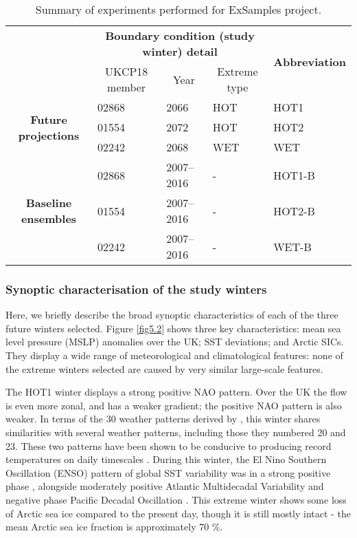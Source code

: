       \begin{table}[h]
        \centering
        \footnotesize
        \begin{tabular}{cllll}
          \toprule
          \multicolumn{1}{l}{\multirow{2}{*}{}}&\multicolumn{3}{c}{\textbf{Boundary condition (study winter) detail}}&\multicolumn{1}{c}{\multirow{2}{*}{\textbf{Abbreviation}}}\\\cmidrule(lr){2-4}
          \multicolumn{1}{l}{}&\multicolumn{1}{c}{UKCP18 member}&\multicolumn{1}{c}{Year}&\multicolumn{1}{c}{Extreme type}&\multicolumn{1}{c}{}\\\midrule
          \multirow{3}{*}{\textbf{Future projections}}&\multicolumn{1}{l}{02868}&\multicolumn{1}{l}{2066}&HOT&HOT1\\
          &\multicolumn{1}{l}{01554}&\multicolumn{1}{l}{2072}&HOT&HOT2\\
          &\multicolumn{1}{l}{02242}&\multicolumn{1}{l}{2068}&WET&WET\\\midrule
          \multirow{3}{*}{\textbf{Baseline ensembles}}&\multicolumn{1}{l}{02868}&\multicolumn{1}{l}{2007--2016}&-&HOT1-B\\
          &\multicolumn{1}{l}{01554}&\multicolumn{1}{l}{2007--2016}&-&HOT2-B\\
          &\multicolumn{1}{l}{02242}&\multicolumn{1}{l}{2007--2016}&-&WET-B\\\bottomrule
        \end{tabular}
        \caption{Summary of experiments performed for ExSamples project.}
        \end{table}

    \subsubsection{Synoptic characterisation of the study winters}

      Here, we briefly describe the broad synoptic characteristics of each of the three future winters selected. Figure \ref{fig5.2} shows three key characteristics: mean sea level pressure (MSLP) anomalies over the UK; SST deviations; and Arctic SICs. They display a wide range of meteorological and climatological features: none of the extreme winters selected are caused by very similar large-scale features.

      The HOT1 winter displays a strong positive NAO pattern. Over the UK the flow is even more zonal, and has a weaker gradient; the positive NAO pattern is also weaker. In terms of the 30 weather patterns derived by \citep{neal_flexible_2016}, this winter shares similarities with several weather patterns, including those they numbered 20 and 23. These two patterns have been shown to be conducive to producing record temperatures on daily timescales \citep{kendon_temperature_2020}. During this winter, the El Nino Southern Oscillation (ENSO) pattern of global SST variability was in a strong positive phase , alongside moderately positive Atlantic Multidecadal Variability and negative phase Pacific Decadal Oscillation \citep{deser_sea_2010}. This extreme winter shows some loss of Arctic sea ice compared to the present day, though it is still mostly intact - the mean Arctic sea ice fraction is approximately 70 \%.

